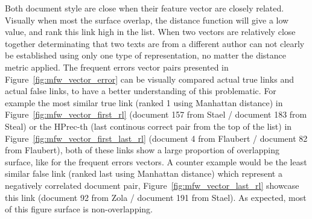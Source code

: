 Both document style are close when their feature vector are closely related.
Visually when most the surface overlap, the distance function will give a low value, and rank this link high in the list.
When two vectors are relatively close together determinating that two texts are from a different author can not clearly be established using only one type of representation, no matter the distance metric applied.
The frequent errors vector pairs presented in Figure~\ref{fig:mfw_vector_error} can be visually compared actual true links and actual false links, to have a better understanding of this problematic.
For example the most similar true link (ranked 1 using Manhattan distance) in Figure~\ref{fig:mfw_vector_first_rl} (document 157 from Stael / document 183 from Steal) or the HPrec-th (last continous correct pair from the top of the list) in Figure~\ref{fig:mfw_vector_first_last_rl} (document 4 from Flaubert / document 82 from Flaubert), both of these links show a large proportion of overlapping surface, like for the frequent errors vectors.
A counter example would be the least similar false link (ranked last using Manhattan distance) which represent a negatively correlated document pair, Figure~\ref{fig:mfw_vector_last_rl} showcase this link (document 92 from Zola / document 191 from Stael).
As expected, most of this figure surface is non-overlapping.

